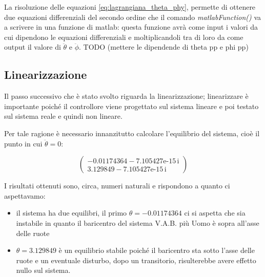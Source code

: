La risoluzione delle equazioni \ref{eq:lagrangiana_theta_phy}, permette di ottenere due equazioni differenziali del secondo ordine che il comando \textit{matlabFunction()} va a scrivere in una funzione di matlab: questa funzione avrà come input i valori da cui dipendono le equazioni differenziali e moltiplicandoli tra di loro da come output il valore di $\ddot{\theta}$ e $\ddot{\phi}$.
TODO (mettere le dipendende di theta pp e phi pp)

\subsection{Linearizzazione}
Il passo successivo che è stato svolto riguarda la linearizzazione; linearizzare è importante poiché il controllore viene progettato sul sistema lineare e poi testato sul sistema reale e quindi non lineare.

Per tale ragione è necessario innanzitutto calcolare l'equilibrio del sistema, cioè il punto in cui $\ddot{\theta} = 0$:
\begin{center}
	$$\left(\begin{array}{c}
		-0.01174364-\text{7.105427e-15}\,\mathrm{i}\\
		3.129849-\text{7.105427e-15}\,\mathrm{i}
	\end{array}\right)$$
\end{center}

I risultati ottenuti sono, circa, numeri naturali e rispondono a quanto ci aspettavamo: 
\begin{itemize}
	\item il sistema ha due equilibri, il primo $\theta = -0.01174364$ ci si aspetta che sia instabile in quanto il baricentro del sistema V.A.B. più Uomo è sopra all'asse delle ruote
	\item  $\theta = 3.129849$ è un equilibrio stabile poiché il baricentro sta sotto l'asse delle ruote e un eventuale disturbo, dopo un transitorio, risulterebbe avere effetto nullo sul sistema.
\end{itemize}

